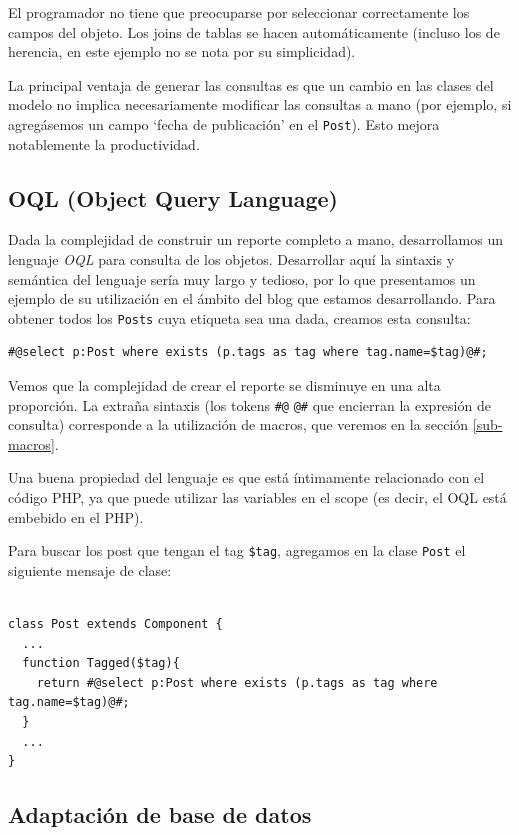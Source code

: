 El programador no tiene que preocuparse por seleccionar correctamente los campos del objeto. Los joins de tablas se hacen automáticamente (incluso los de herencia, en este ejemplo no se nota por su simplicidad).

La principal ventaja de generar las consultas es que un cambio en las clases del modelo no implica necesariamente modificar las consultas a mano (por ejemplo, si agregásemos un campo `fecha de publicación' en el \verb"Post"). Esto mejora notablemente la productividad.

\subsection{OQL (Object Query Language)}
\label{sub-oql}
Dada la complejidad de construir un reporte completo a mano, desarrollamos un lenguaje \emph{OQL} para consulta de los objetos. Desarrollar aquí la sintaxis y semántica del lenguaje sería muy largo y tedioso, por lo que presentamos un ejemplo de su utilización en el ámbito del blog que estamos desarrollando. Para obtener todos los \verb"Posts" cuya etiqueta sea una dada, creamos esta consulta:

\begin{verbatim}
#@select p:Post where exists (p.tags as tag where tag.name=$tag)@#;
\end{verbatim}

Vemos que la complejidad de crear el reporte se disminuye en una alta proporción.
La extraña sintaxis (los tokens \verb"#@" \verb"@#" que encierran la expresión de consulta) corresponde a la utilización de macros, que veremos en la sección \ref{sub-macros}.

Una buena propiedad del lenguaje es que está íntimamente relacionado con el código PHP, ya que puede utilizar las variables en el scope (es decir, el OQL está embebido en el PHP).

Para buscar los post que tengan el tag  \verb"$tag", %
agregamos en la clase \verb"Post" el siguiente mensaje de clase:

\begin{verbatim}

class Post extends Component {
  ...
  function Tagged($tag){
    return #@select p:Post where exists (p.tags as tag where tag.name=$tag)@#;
  }
  ...
}

\end{verbatim}

\subsection{Adaptación de base de datos}
\label{sub-adapt}

